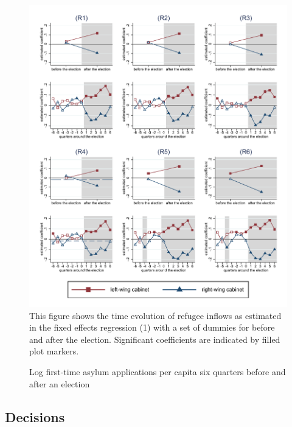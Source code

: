 \documentclass[a4paper,12pt]{article}
\begin{document}
 \begin{figure}
	\centering
    	\caption{Log first-time asylum applications per capita six quarters before and after an election}
	\includegraphics[width=1\textwidth]{inputs/app_graphs_R1-R6.pdf}
    {\footnotesize This figure shows the time evolution of refugee inflows as estimated in the fixed effects regression (1) with a set of dummies for before and after the election. Significant coefficients are indicated by filled plot markers.}
	\label{main_results_bef-after}
\end{figure}
  
\subsection{Decisions}
\end{document}
